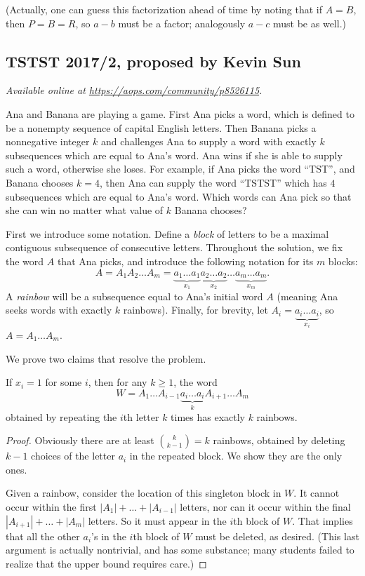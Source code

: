 \documentclass[11pt]{scrartcl}
\begin{document}
(Actually, one can guess this factorization ahead of time
by noting that if $A=B$, then $P=B=R$, so $a-b$ must be a factor;
analogously $a-c$ must be as well.)
\pagebreak

\subsection{TSTST 2017/2, proposed by Kevin Sun}
\textsl{Available online at \url{https://aops.com/community/p8526115}.}
\begin{mdframed}[style=mdpurplebox,frametitle={Problem statement}]
Ana and Banana are playing a game. First Ana picks a word,
which is defined to be a nonempty sequence of capital English letters.
Then Banana picks a nonnegative integer $k$ and challenges Ana
to supply a word with exactly $k$ subsequences which are equal to Ana's word.
Ana wins if she is able to supply such a word, otherwise she loses.
For example, if Ana picks the word ``TST'', and Banana chooses $k = 4$,
then Ana can supply the word ``TSTST'' which has $4$ subsequences
which are equal to Ana's word.
Which words can Ana pick so that she can win no matter what value of
$k$ Banana chooses?
\end{mdframed}
First we introduce some notation.
Define a \emph{block} of letters to be a maximal
contiguous subsequence of consecutive letters.
Throughout the solution, we fix the word $A$ that Ana picks,
and introduce the following notation for its $m$ blocks:
\[ A =
  A_1 A_2 \dots A_m
  = \underbrace{a_1 \dots a_1}_{x_1}
  \underbrace{a_2 \dots a_2}_{x_2}
  \dots
  \underbrace{a_m \dots a_m}_{x_m}.
\]
A \emph{rainbow} will be a subsequence equal to Ana's initial word $A$
(meaning Ana seeks words with exactly $k$ rainbows).
Finally, for brevity, let $A_i = \underbrace{a_i \dots a_i}_{x_i}$,
so $A = A_1 \dots A_m$.


We prove two claims that resolve the problem.
\begin{claim*}
  If $x_i = 1$ for some $i$, then for any $k \ge 1$, the word
  \[ W = A_1 \dots A_{i-1} \underbrace{a_i \dots a_i}_{k}
    A_{i+1} \dots A_m  \]
  obtained by repeating the $i$th letter $k$ times
  has exactly $k$ rainbows.
\end{claim*}
\begin{proof}
  Obviously there are at least $\binom{k}{k-1}=k$ rainbows,
  obtained by deleting $k-1$ choices of the letter $a_i$
  in the repeated block.
  We show they are the only ones.

  Given a rainbow, consider the location of this singleton block in $W$.
  It cannot occur within the first $|A_1| + \dots + |A_{i-1}|$ letters,
  nor can it occur within the final $|A_{i+1}| + \dots + |A_m|$ letters.
  So it must appear in the $i$th block of $W$.
  That implies that all the other $a_i$'s in the
  $i$th block of $W$ must be deleted, as desired.
  (This last argument is actually nontrivial, and has some substance;
  many students failed to realize that the upper bound requires care.)
\end{proof}
\end{document}
